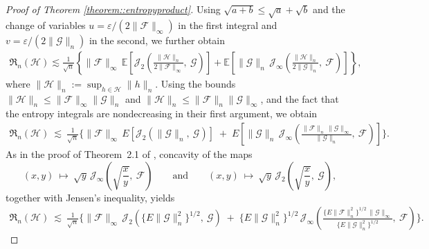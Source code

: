 \documentclass[11pt]{article}
\theoremstyle{plain}
\theoremstyle{definition} %
\begin{document}
\begin{proof}[Proof of Theorem \ref{theorem::entropyproduct}]
Using $\sqrt{a+b}\le \sqrt a+\sqrt b$ and the change of variables
$u=\varepsilon/(2\|\mathcal F\|_\infty)$ in the first integral and
$v=\varepsilon/(2\|\mathcal G\|_n)$ in the second, we further obtain
\begin{align*}
\mathfrak{R}_n(\mathcal{H})
\lesssim
\frac{1}{\sqrt{n}}
\left\{
\|\mathcal F\|_\infty\,
\mathbb{E}\left[
\mathcal{J}_2\left(\frac{\|\mathcal H\|_n}{2\|\mathcal F\|_\infty},\ \mathcal G\right)
\right]
+
\mathbb{E}\left[
\|\mathcal G\|_n\,
\mathcal{J}_\infty\left(\frac{\|\mathcal H\|_n}{2\|\mathcal G\|_n},\ \mathcal F\right)
\right]
\right\},
\end{align*}
where $\|\mathcal H\|_n := \sup_{h\in\mathcal H}\|h\|_n$. Using the bounds $\|\mathcal H\|_n \le \|\mathcal F\|_\infty\|\mathcal G\|_n$ and
$\|\mathcal H\|_n \le \|\mathcal F\|_n\|\mathcal G\|_\infty$, and the fact that the
entropy integrals are nondecreasing in their first argument, we obtain
\begin{align*}
\mathfrak{R}_n(\mathcal{H})
\ \lesssim\
\frac{1}{\sqrt{n}}
\Biggl\{
\|\mathcal{F}\|_{\infty}\,
E\left[
\mathcal{J}_2\left(\|\mathcal{G}\|_{n},\ \mathcal{G}\right)
\right]
\;+\;
E\left[
\|\mathcal{G}\|_{n}\,
\mathcal{J}_{\infty}\left(
\frac{\|\mathcal{F}\|_{n}\,\|\mathcal{G}\|_{\infty}}{\|\mathcal{G}\|_{n}},\ \mathcal{F}
\right)
\right]
\Biggr\}.
\end{align*}
As in the proof of Theorem~2.1 of \cite{van2011local}, concavity of the maps
\[
(x,y)\ \mapsto\ \sqrt{y}\,\mathcal{J}_{\infty}\left(\sqrt{\frac{x}{y}},\ \mathcal{F}\right)
\qquad\text{and}\qquad
(x,y)\ \mapsto\ \sqrt{y}\,\mathcal{J}_{2}\left(\sqrt{\frac{x}{y}},\ \mathcal{G}\right),
\]
together with Jensen's inequality, yields
\begin{align*}
\mathfrak{R}_n(\mathcal{H})
\ \lesssim\
\frac{1}{\sqrt{n}}
\Biggl\{
\|\mathcal{F}\|_{\infty}\,
\mathcal{J}_2\left(
\bigl\{E\|\mathcal{G}\|_{n}^{2}\bigr\}^{1/2},\ \mathcal{G}
\right)
\;+\;
\bigl\{E\|\mathcal{G}\|_{n}^{2}\bigr\}^{1/2}\,
\mathcal{J}_{\infty}\left(
\frac{\bigl\{E\|\mathcal{F}\|_{n}^{2}\bigr\}^{1/2}\,\|\mathcal{G}\|_{\infty}}
{\bigl\{E\|\mathcal{G}\|_{n}^{2}\bigr\}^{1/2}},\ \mathcal{F}
\right)
\Biggr\}.
\end{align*}


\end{proof}
\end{document}
